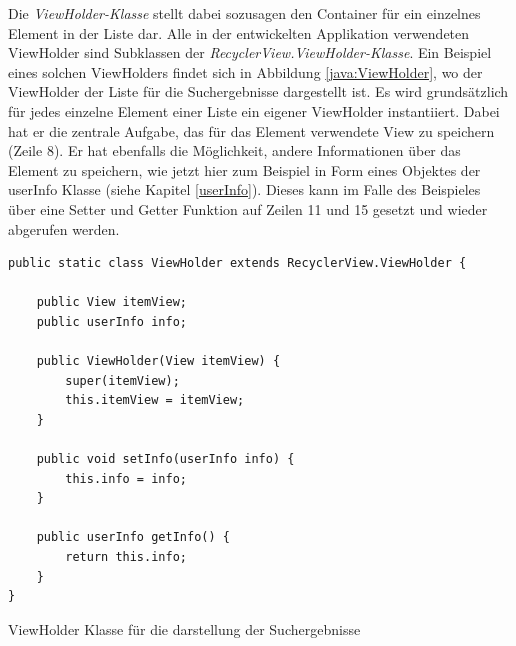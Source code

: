 \documentclass[a4paper,11pt]{report}
\newenvironment{code}{\captionsetup{type=figure}}{}
\begin{document}
				Die \emph{ViewHolder-Klasse} stellt dabei sozusagen den Container für ein einzelnes Element in der Liste dar. Alle in der entwickelten Applikation verwendeten ViewHolder sind Subklassen der \emph{RecyclerView.ViewHolder-Klasse}. Ein Beispiel eines solchen ViewHolders findet sich in Abbildung \ref{java:ViewHolder}, wo der ViewHolder der Liste für die Suchergebnisse dargestellt ist. Es wird grundsätzlich für jedes einzelne Element einer Liste ein eigener ViewHolder instantiiert. Dabei hat er die zentrale Aufgabe, das für das Element verwendete View zu speichern (Zeile 8). Er hat ebenfalls die Möglichkeit, andere Informationen über das Element zu speichern, wie jetzt hier zum Beispiel in Form eines Objektes der userInfo Klasse (siehe Kapitel \ref{userInfo}). Dieses kann im Falle des Beispieles über eine Setter und Getter Funktion auf Zeilen 11 und 15 gesetzt und wieder abgerufen werden.
\begin{code}
	\begin{center}
		\begin{verbatim}
public static class ViewHolder extends RecyclerView.ViewHolder {

	public View itemView;
	public userInfo info;

	public ViewHolder(View itemView) {
		super(itemView);
		this.itemView = itemView;
	}

	public void setInfo(userInfo info) {
		this.info = info;
	}

	public userInfo getInfo() {
		return this.info;
	}
}
		\end{verbatim}
		\caption{ViewHolder Klasse für die darstellung der Suchergebnisse}\label{java:ViewHolder}
	\end{center}
\end{code}
				
\end{document}
